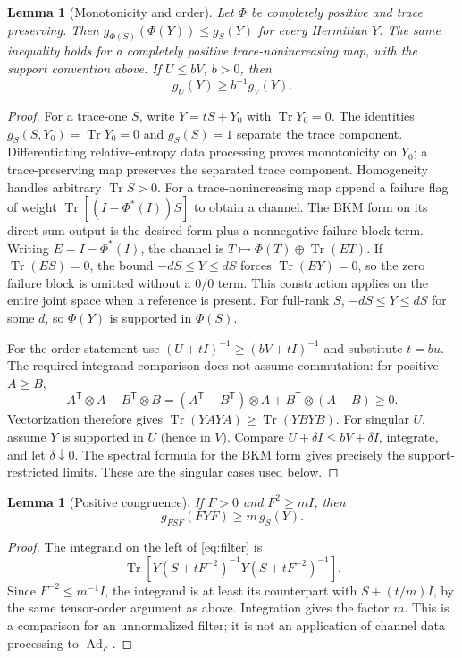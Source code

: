 \documentclass[11pt,a4paper]{article}
\newtheorem{lemma}[theorem]{Lemma}
\theoremstyle{remark}\newtheorem{remark}[theorem]{Remark}
\newcommand{\Tr}{\operatorname{Tr}}
\newcommand{\Ad}{\operatorname{Ad}}
\begin{document}
\begin{lemma}[Monotonicity and order]\label{lem:metric}
Let $\Phi$ be completely positive and trace preserving. Then
$g_{\Phi(S)}(\Phi(Y))\leq g_S(Y)$ for every Hermitian $Y$.
The same inequality holds for a completely positive trace-nonincreasing
map, with the support convention above.
If $U\leq bV$, $b>0$, then
\begin{equation}
 g_U(Y)\geq b^{-1}g_V(Y).
 \label{eq:order}
\end{equation}
\end{lemma}
\begin{proof}
For a trace-one $S$, write $Y=tS+Y_0$ with $\Tr Y_0=0$.
The identities
$g_S(S,Y_0)=\Tr Y_0=0$ and $g_S(S)=1$ separate the trace component.
Differentiating relative-entropy data processing proves monotonicity on
$Y_0$; a trace-preserving map preserves the separated trace component.
Homogeneity handles arbitrary $\Tr S>0$.
For a trace-nonincreasing map append a failure flag of weight
$\Tr[(I-\Phi^*(I))S]$ to obtain a channel. The BKM form on its direct-sum
output is the desired form plus a nonnegative failure-block term.
Writing $E=I-\Phi^*(I)$, the channel is
$T\mapsto\Phi(T)\oplus\Tr(ET)$.
If $\Tr(ES)=0$, the bound $-dS\leq Y\leq dS$ forces
$\Tr(EY)=0$, so the zero failure block is omitted without a $0/0$ term.
This construction applies on the entire joint space when a reference is present.
For full-rank $S$, $-dS\leq Y\leq dS$ for some $d$, so
$\Phi(Y)$ is supported in $\Phi(S)$.

For the order statement use
$(U+tI)^{-1}\geq(bV+tI)^{-1}$ and substitute $t=bu$.
The required integrand comparison does not assume commutation:
for positive $A\geq B$,
\[
 A^{\mathsf T}\otimes A-B^{\mathsf T}\otimes B
 =(A^{\mathsf T}-B^{\mathsf T})\otimes A+
 B^{\mathsf T}\otimes(A-B)\geq0.
\]
Vectorization therefore gives
$\Tr(YAYA)\geq\Tr(YBYB)$.
For singular $U$, assume $Y$ is supported in $U$ (hence in $V$).
Compare $U+\delta I\leq bV+\delta I$, integrate, and let
$\delta\downarrow0$. The spectral formula for the BKM form gives
precisely the support-restricted limits. These are the singular cases used below.
\end{proof}

\begin{lemma}[Positive congruence]\label{lem:filter}
If $F>0$ and $F^2\geq mI$, then
\begin{equation}
 g_{FSF}(FYF)\geq m\,g_S(Y).
 \label{eq:filter}
\end{equation}
\end{lemma}
\begin{proof}
The integrand on the left of \eqref{eq:filter} is
\[
 \Tr\!\left[Y(S+tF^{-2})^{-1}Y(S+tF^{-2})^{-1}\right].
\]
Since $F^{-2}\leq m^{-1}I$, the integrand is at least its counterpart
with $S+(t/m)I$, by the same tensor-order argument as above.
Integration gives the factor $m$.
This is a comparison for an unnormalized filter; it is not an application
of channel data processing to $\Ad_F$.
\end{proof}
\end{document}

